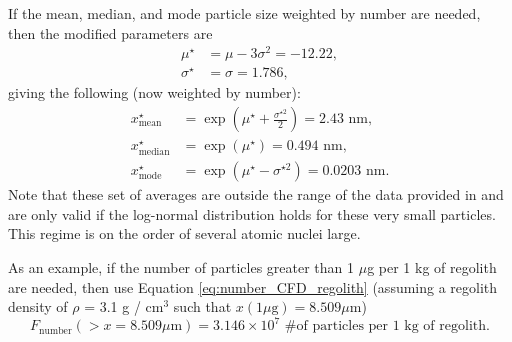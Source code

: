 \documentclass{article}
\begin{document}
If the mean, median, and mode particle size weighted by number are needed, then the modified parameters are
\begin{align}
\mu^\star &= \mu - 3\sigma^2 = -12.22,\\
\sigma^\star &= \sigma = 1.786,
\end{align}
giving the following (now weighted by number):
\begin{align}
x^\star_{\text{mean}} &= \exp\left(\mu^\star + \frac{\sigma^{\star 2}}{2}\right) = 2.43 \text{ nm},\\
x^\star_{\text{median}} &= \exp(\mu^\star) = 0.494 \text{ nm},\\
x^\star_{\text{mode}} &=  \exp\left(\mu^\star - \sigma^{\star 2}\right) = 0.0203 \text{ nm}.
\end{align}
Note that these set of averages are outside the range of the data provided in \cite{carrier2003particle} and are only valid if the log-normal distribution holds for these very small particles. This regime is on the order of several atomic nuclei large.


As an example, if the number of particles greater than 1 $\mu$g per 1 kg of regolith are needed, then use Equation \eqref{eq:number_CFD_regolith} (assuming a regolith density of $\rho$ = 3.1 g / cm$^3$ such that $x(1 \mu\text{g}) = 8.509 \mu\text{m}$)
\begin{equation}
F_{\text{number}}(> x = 8.509 \mu\text{m}) = 3.146\times 10^{7} \text{ \# of particles per 1 kg of regolith}.
\end{equation}
\end{document}

